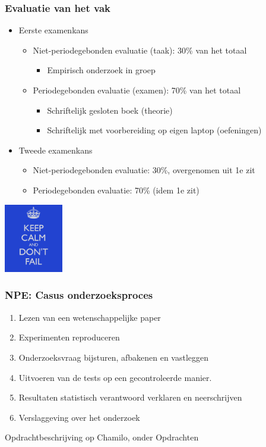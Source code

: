 \documentclass{beamer}
\begin{document}
\begin{frame}
  \frametitle{Evaluatie van het vak}

  \begin{itemize}
    \item Eerste examenkans
      \begin{itemize}
        \item Niet-periodegebonden evaluatie (taak): 30\% van het totaal
          \begin{itemize}
            \item Empirisch onderzoek in groep
          \end{itemize}
        \item Periodegebonden evaluatie (examen): 70\% van het totaal
        \begin{itemize}
          \item Schriftelijk gesloten boek (theorie)
          \item Schriftelijk met voorbereiding op eigen laptop (oefeningen)
        \end{itemize}
      \end{itemize}
    \item Tweede examenkans
      \begin{itemize}
        \item Niet-periodegebonden evaluatie: 30\%, overgenomen uit 1e zit
        \item Periodegebonden evaluatie: 70\% (idem 1e zit)
      \end{itemize}
  \end{itemize}

  \begin{center}
    \includegraphics[height=3cm]{img/intro-07}
  \end{center}
\end{frame}

\begin{frame}
  \frametitle{NPE: Casus onderzoeksproces}


  \begin{enumerate}
    \item Lezen van een wetenschappelijke paper
    \item Experimenten reproduceren
    \item Onderzoeksvraag bijsturen, afbakenen en vastleggen
    \item Uitvoeren van de tests op een gecontroleerde manier.
    \item Resultaten statistisch verantwoord verklaren en neerschrijven
    \item Verslaggeving over het onderzoek
  \end{enumerate}

  Opdrachtbeschrijving op Chamilo, onder Opdrachten
\end{frame}

\end{document}
